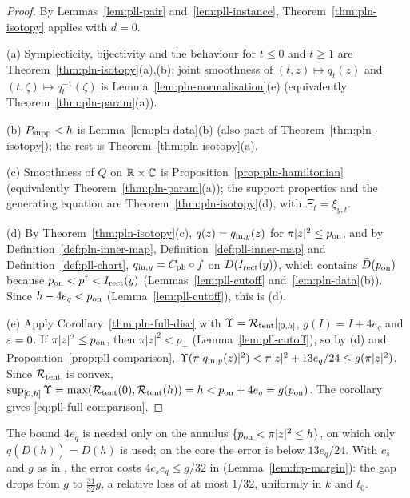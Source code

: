 \begin{proof}
By Lemmas~\ref{lem:pll-pair} and~\ref{lem:pll-instance}, Theorem~\ref{thm:pln-isotopy} applies with $d=0$.

(a) Symplecticity, bijectivity and the behaviour for $t\le0$ and $t\ge1$ are Theorem~\ref{thm:pln-isotopy}(a),(b);
joint smoothness of $(t,z)\mapsto q_t(z)$ and $(t,\zeta)\mapsto q_t^{-1}(\zeta)$ is Lemma~\ref{lem:pln-normalisation}(e)
(equivalently Theorem~\ref{thm:pln-param}(a)).

(b) $P_{\rm supp}<h$ is Lemma~\ref{lem:pln-data}(b) (also part of Theorem~\ref{thm:pln-isotopy}); the rest is
Theorem~\ref{thm:pln-isotopy}(a).

(c) Smoothness of $Q$ on $\mathbb{R}\times\mathbb{C}$ is Proposition~\ref{prop:pln-hamiltonian} (equivalently
Theorem~\ref{thm:pln-param}(a)); the support properties and the generating equation are
Theorem~\ref{thm:pln-isotopy}(d), with $\Xi_t=\xi_{y,t}$.

(d) By Theorem~\ref{thm:pln-isotopy}(c), $q(z)=q_{{\rm in},y}(z)$ for $\pi|z|^2\le p_{\rm on}$, and by
Definition~\ref{def:pln-inner-map}, Definition~\ref{def:pll-inner-map} and Definition~\ref{def:pll-chart},
$q_{{\rm in},y}=C_{\rm ph}\circ f$ on $D(I_{\rm rect}(y))$, which contains $\bar D(p_{\rm on})$ because
$p_{\rm on}<p^\dagger<I_{\rm rect}(y)$ (Lemmas~\ref{lem:pll-cutoff} and~\ref{lem:pln-data}(b)). Since
$h-4e_q<p_{\rm on}$ (Lemma~\ref{lem:pll-cutoff}), this is (d).

(e) Apply Corollary~\ref{thm:pln-full-disc} with $\Upsilon=\mathcal{R}_{\rm tent}|_{[0,h]}$, $g(I)=I+4e_q$ and $\varepsilon=0$. If
$\pi|z|^2\le p_{\rm on}$, then $\pi|z|^2<p_+$ (Lemma~\ref{lem:pll-cutoff}), so by (d) and
Proposition~\ref{prop:pll-comparison}, $\Upsilon(\pi|q_{{\rm in},y}(z)|^2)<\pi|z|^2+13e_q/24\le g(\pi|z|^2)$. Since
$\mathcal{R}_{\rm tent}$ is convex, $\sup_{[0,h]}\Upsilon=\max(\mathcal{R}_{\rm tent}(0),\mathcal{R}_{\rm tent}(h))=h<p_{\rm on}+4e_q=g(p_{\rm on})$.
The corollary gives \eqref{eq:pll-full-comparison}.
\end{proof}

The bound $4e_q$ is needed only on the annulus $\{p_{\rm on}<\pi|z|^2\le h\}$, on which only $q(\bar D(h))=\bar D(h)$
is used; on the core the error is below $13e_q/24$. With $c_s$ and $g$ as in , the error costs $4c_se_q\le g/32$ in
 (Lemma~\ref{lem:fcp-margin}): the gap drops from $g$ to $\frac{31}{32}g$, a relative loss of at most
$1/32$, uniformly in $k$ and $t_0$.
